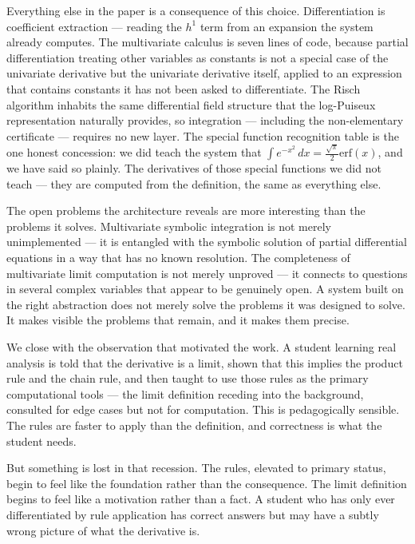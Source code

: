 \documentclass[12pt]{article}
\begin{document}
Everything else in the paper is a consequence of this choice.
Differentiation is coefficient extraction --- reading the \(h^1\) term
from an expansion the system already computes. The multivariate calculus
is seven lines of code, because partial differentiation treating other
variables as constants is not a special case of the univariate
derivative but the univariate derivative itself, applied to an
expression that contains constants it has not been asked to
differentiate. The Risch algorithm inhabits the same differential field
structure that the log-Puiseux representation naturally provides, so
integration --- including the non-elementary certificate --- requires no
new layer. The special function recognition table is the one honest
concession: we did teach the system that
\(\int e^{-x^2}\,dx = \frac{\sqrt{\pi}}{2}\mathrm{erf}(x)\), and we have
said so plainly. The derivatives of those special functions we did not
teach --- they are computed from the definition, the same as everything
else.

The open problems the architecture reveals are more interesting than the
problems it solves. Multivariate symbolic integration is not merely
unimplemented --- it is entangled with the symbolic solution of partial
differential equations in a way that has no known resolution. The
completeness of multivariate limit computation is not merely unproved
--- it connects to questions in several complex variables that appear to
be genuinely open. A system built on the right abstraction does not
merely solve the problems it was designed to solve. It makes visible the
problems that remain, and it makes them precise.

We close with the observation that motivated the work. A student
learning real analysis is told that the derivative is a limit, shown
that this implies the product rule and the chain rule, and then taught
to use those rules as the primary computational tools --- the limit
definition receding into the background, consulted for edge cases but
not for computation. This is pedagogically sensible. The rules are
faster to apply than the definition, and correctness is what the student
needs.

But something is lost in that recession. The rules, elevated to primary
status, begin to feel like the foundation rather than the consequence.
The limit definition begins to feel like a motivation rather than a
fact. A student who has only ever differentiated by rule application has
correct answers but may have a subtly wrong picture of what the
derivative is.
\end{document}
